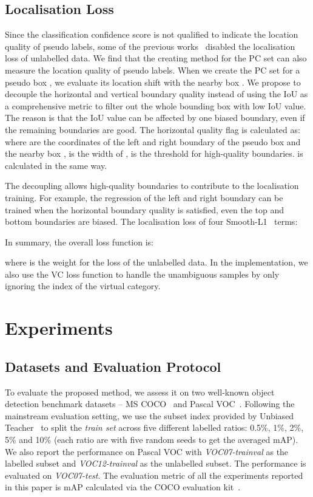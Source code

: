 \documentclass[runningheads]{llncs}
\begin{document}
\subsection{Localisation Loss}
Since the classification confidence score is not qualified to indicate the location quality of pseudo labels, some of the previous works~\cite{Yen-Cheng_2021_Unb,Kihyuk_2020_SATC} disabled the localisation loss of unlabelled data. We find that the creating method for the PC set can also measure the location quality of pseudo labels. When we create the PC set for a pseudo box , we evaluate its location shift with the nearby box . We propose to decouple the horizontal and vertical boundary quality instead of using the IoU as a comprehensive metric to filter out the whole bounding box with low IoU value. The reason is that the IoU value can be affected by one biased boundary, even if the remaining boundaries are good. The horizontal quality flag  is calculated as:
 where  are the coordinates of the left and right boundary of the pseudo box  and the nearby box ,  is the width of ,  is the threshold for high-quality boundaries.  is calculated in the same way.

The decoupling allows high-quality boundaries to contribute to the localisation training. For example, the regression of the left and right boundary can be trained when the horizontal boundary quality is satisfied, even the top and bottom boundaries are biased. The localisation loss of four Smooth-L1~\cite{Ross_2015_Fas} terms:


In summary, the overall loss function is:

where  is the weight for the loss of the unlabelled data. In the implementation, we also use the VC loss function to handle the unambiguous samples by only ignoring the index of the virtual category.

\section{Experiments}

\subsection{Datasets and Evaluation Protocol}
To evaluate the proposed method, we assess it on two well-known object detection benchmark datasets -- MS COCO~\cite{Tsung-Yi_2014_Mic} and Pascal VOC~\cite{Mark_2015_The}. Following the mainstream evaluation setting, we use the subset index provided by Unbiased Teacher~\cite{Yen-Cheng_2021_Unb} to split the \textit{train set} across five different labelled ratios: 0.5\%, 1\%, 2\%, 5\% and 10\% (each ratio are with five random seeds to get the averaged mAP). We also report the performance on Pascal VOC with \textit{VOC07-trainval} as the labelled subset and \textit{VOC12-trainval} as the unlabelled subset. The performance is evaluated on \textit{VOC07-test}. The evaluation metric of all the experiments reported in this paper is mAP calculated via the COCO evaluation kit~\cite{coco_eval_kit}.
\end{document}
